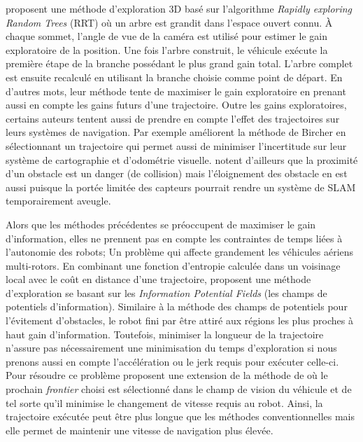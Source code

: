 \citep{Bircher2016} proposent une méthode d'exploration 3D basé sur l'algorithme \textit{Rapidly exploring Random Trees} (RRT) où un arbre est grandit dans l'espace ouvert connu. À chaque sommet, l'angle de vue de la caméra est utilisé pour estimer le gain exploratoire de la position. Une fois l'arbre construit, le véhicule exécute la première étape de la branche possédant le plus grand gain total. L'arbre complet est ensuite recalculé en utilisant la branche choisie comme point de départ. En d'autres mots, leur méthode tente de maximiser le gain exploratoire en prenant aussi en compte les gains futurs d'une trajectoire. Outre les gains exploratoires, certains auteurs tentent aussi de prendre en compte l'effet des trajectoires sur leurs systèmes de navigation. Par exemple \citep{Papachristos2017} améliorent la méthode de Bircher en sélectionnant un trajectoire qui permet aussi de minimiser l'incertitude sur leur système de cartographie et d'odométrie visuelle. \citep{Wirth2007} notent d'ailleurs que la proximité d'un obstacle est un danger (de collision) mais l'éloignement des obstacle en est aussi puisque la portée limitée des capteurs pourrait rendre un système de SLAM temporairement aveugle.

Alors que les méthodes précédentes se préoccupent de maximiser le gain d'information, elles ne prennent pas en compte les contraintes de temps liées à l'autonomie des robots; Un problème qui affecte grandement les véhicules aériens multi-rotors. En combinant une fonction d'entropie calculée dans un voisinage local avec le coût en distance d'une trajectoire, \citep{Wang2017} proposent une méthode d'exploration se basant sur les \textit{Information Potential Fields} (les champs de potentiels d'information). Similaire à la méthode des champs de potentiels pour l'évitement d'obstacles, le robot fini par être attiré aux régions les plus proches à haut gain d'information. Toutefois, minimiser la longueur de la trajectoire n'assure pas nécessairement une minimisation du temps d'exploration si nous prenons aussi en compte l'accélération ou le jerk requis pour exécuter celle-ci. Pour résoudre ce problème \citep{Cieslewski2017} proposent une extension de la méthode de \citep{Yamauchi1997} où le prochain \textit{frontier} choisi est sélectionné dans le champ de vision du véhicule et de tel sorte qu'il minimise le changement de vitesse requis au robot. Ainsi, la trajectoire exécutée peut être plus longue que les méthodes conventionnelles mais elle permet de maintenir une vitesse de navigation plus élevée.

